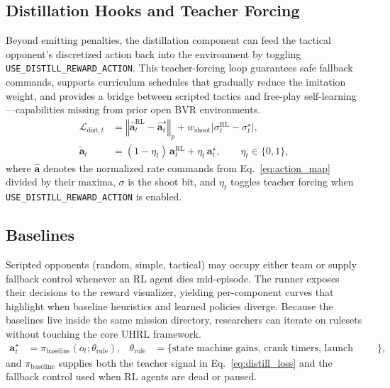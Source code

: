 \documentclass[11pt]{article}
\begin{document}
\subsection{Distillation Hooks and Teacher Forcing}
Beyond emitting penalties, the distillation component can feed the tactical opponent's discretized action back into the environment by toggling \texttt{USE\_DISTILL\_REWARD\_ACTION}. This teacher-forcing loop guarantees safe fallback commands, supports curriculum schedules that gradually reduce the imitation weight, and provides a bridge between scripted tactics and free-play self-learning---capabilities missing from prior open BVR environments.
\begin{align}
\mathcal{L}_{\text{dist},t} &= \left\Vert \hat{\mathbf{a}}^{\text{RL}}_t - \hat{\mathbf{a}}^{\star}_t \right\Vert_p + w_{\text{shoot}}\big|\sigma^{\text{RL}}_t - \sigma^{\star}_t\big|, \label{eq:distill_loss}\\
\tilde{\mathbf{a}}_t &= (1-\eta_t)\,\mathbf{a}^{\text{RL}}_t + \eta_t\,\mathbf{a}^{\star}_t,\qquad \eta_t \in \{0,1\}, \label{eq:teacher_force}
\end{align}
where $\hat{\mathbf{a}}$ denotes the normalized rate commands from Eq.~\eqref{eq:action_map} divided by their maxima, $\sigma$ is the shoot bit, and $\eta_t$ toggles teacher forcing when \texttt{USE\_DISTILL\_REWARD\_ACTION} is enabled.

\subsection{Baselines}
Scripted opponents (random, simple, tactical) may occupy either team or supply fallback control whenever an RL agent dies mid-episode. The runner exposes their decisions to the reward visualizer, yielding per-component curves that highlight when baseline heuristics and learned policies diverge. Because the baselines live inside the same mission directory, researchers can iterate on rulesets without touching the core UHRL framework.
\begin{align}
\mathbf{a}^{\star}_t &= \pi_{\text{baseline}}\!\left(o_t;\theta_{\text{rule}}\right),&
\theta_{\text{rule}} &= \{\text{state machine gains, crank timers, launch thresholds}\}, \label{eq:baseline_policy}
\end{align}
and $\pi_{\text{baseline}}$ supplies both the teacher signal in Eq.~\eqref{eq:distill_loss} and the fallback control used when RL agents are dead or paused.
\end{document}
